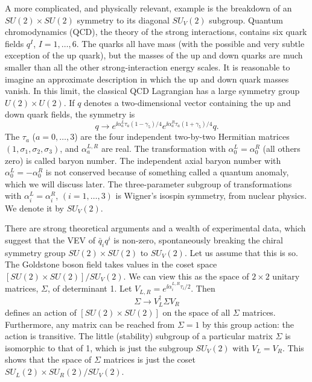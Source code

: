 A more complicated, and physically relevant, example is the breakdown of an
$SU(2)\times SU(2)$ symmetry to its diagonal $SU_V(2)$ subgroup. Quantum
chromodynamics (QCD), the theory of the strong interactions, contains six quark
fields $q^I$, $I=1,\ldots,6$. The quarks all have mass (with the possible and
very subtle exception of the up quark), but the masses of the up and down quarks
are much smaller than all the other strong-interaction energy scales. It is
reasonable to imagine an approximate description in which the up and down quark
masses vanish. In this limit, the classical QCD Lagrangian has a large symmetry
group $U(2)\times U(2)$. If $q$ denotes a two-dimensional vector containing the
up and down quark fields, the symmetry is
\begin{equation*}
  q\longrightarrow e^{\ii\alpha_a^L\tau_a(1-\gamma_5)/4}
  e^{\ii\alpha_a^R\tau_a(1+\gamma_5)/4}q.
\end{equation*}
The $\tau_a$ ($a=0,\ldots,3$) are the four independent two-by-two Hermitian
matrices $(1,\sigma_1,\sigma_2,\sigma_3)$, and $\alpha_a^{L,R}$ are real.
The transformation with $\alpha_0^L=\alpha_0^R$ (all others zero) is called
baryon number. The independent axial baryon number with
$\alpha_0^L=-\alpha_0^R$ is not conserved because of something called a
quantum anomaly, which we will discuss later. The three-parameter subgroup of
transformations with $\alpha_i^L=\alpha_i^R$, $(i=1,\ldots,3)$ is Wigner's
isospin symmetry, from nuclear physics. We denote it by $SU_V(2)$.

There are strong theoretical arguments and a wealth of experimental data, which
suggest that the VEV of $\bar q_iq^i$ is non-zero, spontaneously breaking the
chiral symmetry group $SU(2)\times SU(2)$ to $SU_V(2)$. Let us assume that this
is so. The Goldstone boson field takes values in the coset space
$[SU(2)\times SU(2)]/SU_V(2)$. We can view this as the space of $2\times2$
unitary matrices, $\Sigma$, of determinant 1. Let
$V_{L,R}=e^{\ii\alpha_i^{L,R}\tau_i/2}$. Then
\begin{equation*}
  \Sigma\longrightarrow V_L^\dagger\Sigma V_R
\end{equation*}
defines an action of $[SU(2)\times SU(2)]$ on the space of all $\Sigma$
matrices. Furthermore, any matrix can be reached from $\Sigma=1$ by this group
action: the action is transitive. The little (stability) subgroup of a
particular matrix $\Sigma$ is isomorphic to that of 1, which is just the
subgroup $SU_V(2)$ with $V_L=V_R$. This shows that the space of $\Sigma$
matrices is just the coset $SU_L(2)\times SU_R(2)/SU_V(2)$.

